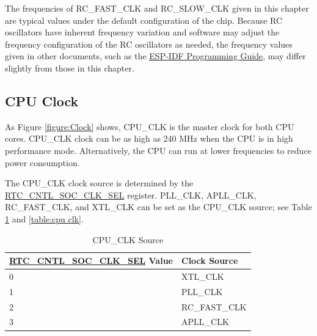 \documentclass[main\_\_EN.tex]{subfiles}
\begin{document}
\begin{tiplisting}
The frequencies of RC\_FAST\_CLK and RC\_SLOW\_CLK given in this chapter are typical values under the default configuration of the chip. Because RC oscillators have inherent frequency variation and software may adjust the frequency configuration of the RC oscillators as needed, the frequency values given in other documents, such as the \href{https://docs.espressif.com/projects/esp-idf/en/latest/esp32/api-reference/peripherals/clk_tree.html}{ESP-IDF Programming Guide}, may differ slightly from those in this chapter.
\end{tiplisting}

\subsection{CPU Clock}

As Figure \ref{figure:Clock} shows, CPU\_CLK is the master clock for both CPU cores. CPU\_CLK clock can be as high as 240 MHz when the CPU is in high performance mode. Alternatively, the CPU can run at lower frequencies to reduce power consumption.

The CPU\_CLK clock source is determined by the \hyperref[regdesc:RTCCNTLSOCCLKSEL]{RTC\_CNTL\_SOC\_CLK\_SEL} register. PLL\_CLK, APLL\_CLK, RC\_FAST\_CLK, and XTL\_CLK can be set as the CPU\_CLK source; see Table \ref{table:cpu clksrc} and \ref{table:cpu clk}.
\begin{longtable}[c]{|l|l| }
       \caption{CPU\_CLK Source}
		\label{table:cpu clksrc}
	    \\\hline
        \rowcolor{lightgray}
        \hyperref[regdesc:RTCCNTLSOCCLKSEL]{RTC\_CNTL\_SOC\_CLK\_SEL} Value & Clock Source \\
        \hline
        0 & XTL\_CLK \\
        \hline
        1 & PLL\_CLK \\
        \hline
        2 & RC\_FAST\_CLK \\
        \hline
        3 & APLL\_CLK \\
        \hline
\end{longtable}
\end{document}
